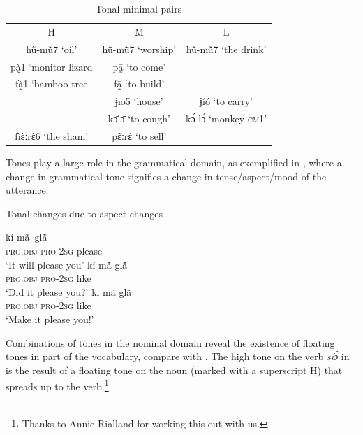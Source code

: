\documentclass[output=paper]{langscibook}
\begin{document}
\begin{table}
\caption{Tonal minimal pairs\label{tab:traore:minimal_pairs:3}}
\begin{tabularx}{.7\textwidth}{c c c}
 H & M & L \\
 \lsptoprule
hũ̀-mũ̀7  ‘oil’ & hũ̄-mũ̄7 ‘worship’ & hṹ-mṹ7  ‘the drink’\\
 pà̰1 ‘monitor lizard & pā̰     ‘to come’ &  \\
 fà̰1 ‘bamboo tree &   fā̰      ‘to build’& \\
  &  ɉīō5  `house’ & ɉíó  ‘to carry’\\
  & kɔ̄lɔ̄   ‘to cough’ &  kɔ́-lɔ́ ‘monkey-\textsc{cm1}’\\
  fìὲːrὲ6  ‘the sham’ & pέːrέ  ‘to sell’ \\
\end{tabularx}
\end{table}

Tones play a large role in the grammatical domain, as exemplified in , where a change in grammatical tone signifies a change in tense/aspect/mood of the utterance. 

\begin{exe}
    \ex Tonal changes due to aspect changes \label{ex:traore:tonal_change_aspect_change:1}
    \begin{xlist}
     \ex \gll kí              {mã̀ }           glã́ \\
         \textsc{pro}.\textsc{obj}     \textsc{pro}{}-2\textsc{sg}    please\\
         \trans `It will please you'
    \ex \gll  kí               mã́             glã́ \\
            \textsc{pro}.\textsc{obj}     \textsc{pro}{}-2\textsc{sg}   like\\
            \trans `Did it please you?'
    \ex \gll kī              mã̄              glã̀ \\
        \textsc{pro}.\textsc{obj}    \textsc{pro}{}-2\textsc{sg}   like\\
        \trans  `Make it please you!'
    \end{xlist}

\end{exe}

Combinations of tones in the nominal domain reveal the existence of floating tones in part of the vocabulary, compare  with . The high tone on the verb \textit{síɔ́} in  is the result of a floating tone on the noun (marked with a superscript H) that spreads up to the verb.\footnote{\textsuperscript{} Thanks to Annie Rialland for working this out with us.}  
\end{document}
